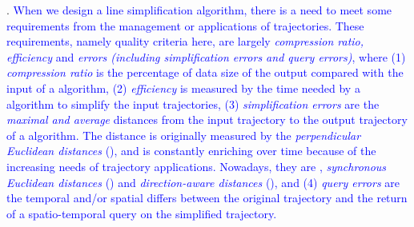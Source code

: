 . 
\textcolor{blue}{When we design a line simplification algorithm, there is a need to meet some requirements from the management or applications of trajectories. These requirements, namely quality criteria here, are largely \emph{compression ratio, efficiency} and \emph{errors (including simplification errors and query errors)}, where 
(1) \emph{compression ratio} is the percentage of data size of the output compared with the input of a \lsa algorithm, 
(2) \emph{efficiency} is measured by the time needed by a \lsa algorithm to simplify the input trajectories,
(3) \emph{simplification errors} are the \emph{maximal and average} distances from the input trajectory to the output trajectory of a \lsa algorithm. The distance is originally measured by the \emph{perpendicular Euclidean distances} (\ped), and is constantly enriching over time because of the increasing needs of trajectory applications. Nowadays, they are \ped, \emph{synchronous Euclidean distances} (\sed) and \emph{direction-aware distances} (\dad), and}
\textcolor{blue}{(4) \emph{query errors} are the temporal and/or spatial differs between the original trajectory and the return of a spatio-temporal query \cite{Meratnia:Spatiotemporal, Lin:Cised} on the simplified trajectory.}




